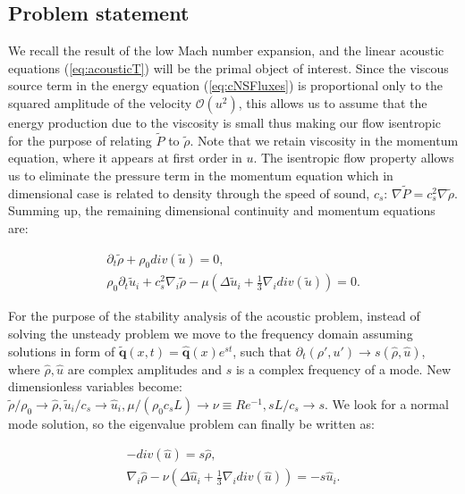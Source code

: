 \subsection{Problem statement}

We recall the result of the low Mach number expansion, and the linear acoustic equations (\ref{eq:acousticT}) will be the primal object of interest. Since the viscous source term in the energy equation (\ref{eq:cNSFluxes}) is proportional only to the squared amplitude of the velocity $\mathcal{O}(u^2)$, this allows us to assume that the energy production due to the viscosity is small thus making our flow isentropic for the purpose of relating $\tilde{P}$ to $\tilde{\rho}$. Note that we retain viscosity in the momentum equation, where it appears at first order in $u$. The isentropic flow property allows us to eliminate the pressure term in the momentum equation which in dimensional case is related to density through the speed of sound, $c_s$: $\nabla \tilde{P} = c_s^2 \nabla \tilde{\rho}$. Summing up, the remaining dimensional continuity and momentum equations are:

\begin{subequations}
\label{eq:linNS}
\begin{align}
        \partial_t \tilde{\rho} + \rho_0 div(\tilde{u}) = 0, \\
        \rho_0 \partial_t \tilde{u}_i + c_s^2 \nabla_i \tilde{\rho} - \mu \left(\Delta \tilde{u}_i + \frac{1}{3} \nabla_i div(\tilde{u}) \right) = 0.
\end{align}
\end{subequations}

For the purpose of the stability analysis of the acoustic problem, instead of solving the unsteady problem we move to the frequency domain assuming solutions in form of $\tilde{\mathbf{q}}(x,t) = \hat{\mathbf{q}}(x) e^{st}$, such that $\partial_t (\rho', u') \rightarrow s (\hat{\rho}, \hat{u})$, where $\hat{\rho}, \hat{u}$ are  complex  amplitudes  and $s$ is a complex  frequency  of  a  mode. New dimensionless variables become: $\tilde{\rho}/\rho_0 \rightarrow \hat{\rho}, \tilde{u}_i / c_s \rightarrow \hat{u}_i , \mu/ (\rho_0 c_s L) \rightarrow \nu \equiv Re^{-1}, s L/c_s \rightarrow s $. We  look  for  a  normal mode solution, so the  eigenvalue problem can finally be written as:

\begin{subequations}
\label{eq:strViscAc}
\begin{align}
        -div(\hat{u}) = s \hat{\rho}, \\
        \nabla_i \hat{\rho} - \nu \left(\Delta \hat{u}_i + \frac{1}{3} \nabla_i div(\hat{u}) \right) = - s \hat{u}_i .
\end{align}
\end{subequations}

